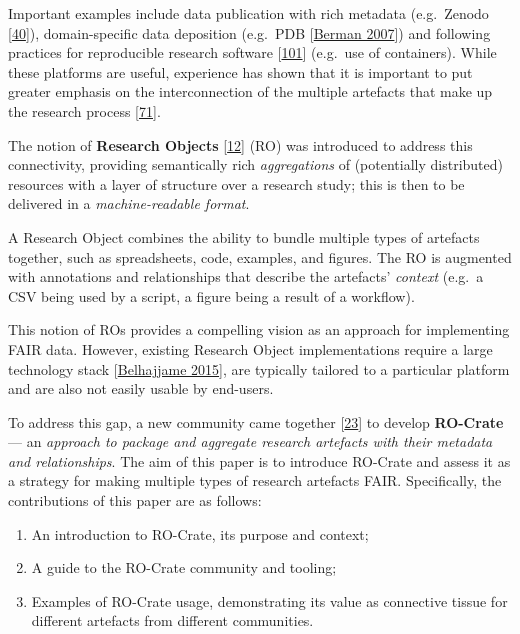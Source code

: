 Important examples include data publication with rich metadata
(e.g.~Zenodo {[}\href{https://doi.org/10.3897/biss.3.37080}{40}{]}),
domain-specific data deposition (e.g.~PDB
{[}\href{https://doi.org/10.1093/nar/gkl971}{Berman 2007}{]}) and following
practices for reproducible research software
{[}\href{https://doi.org/10.1371/journal.pcbi.1003285}{101}{]} (e.g.~use
of containers). While these platforms are useful, experience has shown
that it is important to put greater emphasis on the interconnection of
the multiple artefacts that make up the research process
{[}\href{https://doi.org/10.1016/j.ijhcs.2020.102562}{71}{]}.

The notion of \textbf{Research Objects}
{[}\href{https://www.research.manchester.ac.uk/portal/en/publications/why-linked-data-is-not-enough-for-scientists(479e591e-b295-4478-b0c7-a145c19dcd45).html}{12}{]}
(RO) was introduced to address this connectivity, providing semantically
rich \emph{aggregations} of (potentially distributed) resources with a
layer of structure over a research study; this is then to be delivered
in a \emph{machine-readable format}.

A Research Object combines the ability to bundle multiple types of
artefacts together, such as spreadsheets, code, examples, and figures.
The RO is augmented with annotations and relationships that describe the
artefacts' \emph{context} (e.g.~a CSV being used by a script, a figure
being a result of a workflow).

This notion of ROs provides a compelling vision as an approach for
implementing FAIR data. However, existing Research Object
implementations require a large technology stack
{[}\href{https://doi.org/10.1016/j.websem.2015.01.003}{Belhajjame 2015}{]}, are
typically tailored to a particular platform and are also not easily
usable by end-users.

To address this gap, a new community came together
{[}\href{https://doi.org/10.5281/zenodo.3250687}{23}{]} to develop
\textbf{RO-Crate} --- an \emph{approach to package and aggregate
research artefacts with their metadata and relationships}. The aim of
this paper is to introduce RO-Crate and assess it as a strategy for
making multiple types of research artefacts FAIR. Specifically, the
contributions of this paper are as follows:

\begin{enumerate}
\def\labelenumi{\arabic{enumi}.}
\tightlist
\item
  An introduction to RO-Crate, its purpose and context;
\item
  A guide to the RO-Crate community and tooling;
\item
  Examples of RO-Crate usage, demonstrating its value as connective
  tissue for different artefacts from different communities.
\end{enumerate}

